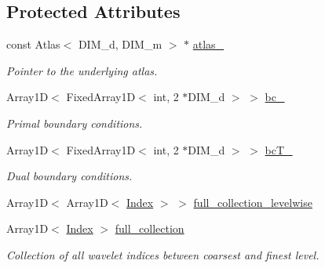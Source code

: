 \subsection*{Protected Attributes}
\begin{CompactItemize}
\item 
\hypertarget{classFrameTL_1_1AggregatedFrame_fd1cef884cecf5fb9ed32f61c9f0177a}{
const Atlas$<$ DIM\_\-d, DIM\_\-m $>$ $\ast$ \hyperlink{classFrameTL_1_1AggregatedFrame_fd1cef884cecf5fb9ed32f61c9f0177a}{atlas\_\-}}
\label{classFrameTL_1_1AggregatedFrame_fd1cef884cecf5fb9ed32f61c9f0177a}

\begin{CompactList}\small\item\em Pointer to the underlying atlas. \item\end{CompactList}\item 
\hypertarget{classFrameTL_1_1AggregatedFrame_405d6414002f06c408d861fbb46ba23e}{
Array1D$<$ FixedArray1D$<$ int, 2 $\ast$DIM\_\-d $>$ $>$ \hyperlink{classFrameTL_1_1AggregatedFrame_405d6414002f06c408d861fbb46ba23e}{bc\_\-}}
\label{classFrameTL_1_1AggregatedFrame_405d6414002f06c408d861fbb46ba23e}

\begin{CompactList}\small\item\em Primal boundary conditions. \item\end{CompactList}\item 
\hypertarget{classFrameTL_1_1AggregatedFrame_be92c570fec801bbce9b38d28a9592dd}{
Array1D$<$ FixedArray1D$<$ int, 2 $\ast$DIM\_\-d $>$ $>$ \hyperlink{classFrameTL_1_1AggregatedFrame_be92c570fec801bbce9b38d28a9592dd}{bcT\_\-}}
\label{classFrameTL_1_1AggregatedFrame_be92c570fec801bbce9b38d28a9592dd}

\begin{CompactList}\small\item\em Dual boundary conditions. \item\end{CompactList}\item 
Array1D$<$ Array1D$<$ \hyperlink{classFrameTL_1_1FrameIndex}{Index} $>$ $>$ \hyperlink{classFrameTL_1_1AggregatedFrame_71d04f538cfd359189ed4898712c54b0}{full\_\-collection\_\-levelwise}
\item 
\hypertarget{classFrameTL_1_1AggregatedFrame_313890332cb2c5db9fb6d0964dedb005}{
Array1D$<$ \hyperlink{classFrameTL_1_1FrameIndex}{Index} $>$ \hyperlink{classFrameTL_1_1AggregatedFrame_313890332cb2c5db9fb6d0964dedb005}{full\_\-collection}}
\label{classFrameTL_1_1AggregatedFrame_313890332cb2c5db9fb6d0964dedb005}

\begin{CompactList}\small\item\em Collection of all wavelet indices between coarsest and finest level. \item\end{CompactList}\end{CompactItemize}


